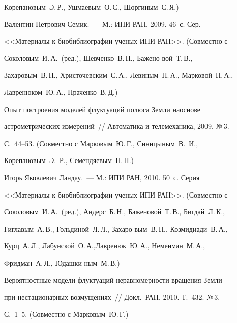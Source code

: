 Корепановым~Э.\,Р., Ушмаевым~О.\,С., Шоргиным~С.\,Я.)





 Валентин Петрович Семик.~--- М.: ИПИ РАН, 2009. 46~с. Сер.\


<<Материалы к биобиблиографии ученых ИПИ РАН>>. (Совместно с


Соколовым~И.\,А.\ (ред.), Шевченко~В.\,Н., Бажено-\linebreak вой~Т.\,В.,


Захаровым~В.\,Н., Христочевским~С.\,А., Левиным~Н.\,А., Марковой~Н.\,А.,


Лавренюком~Ю.\,А., Праченко~В.\,Д.)





 Опыт построения моделей флуктуаций полюса Земли на\linebreak осно\-ве


астрометрических измерений~// Автоматика и телемеханика, 2009. №\,3.


С.~44--53. (Совместно с Марковым~Ю.\,Г., Синицыным~В. \,И.,


Корепановым~Э. \,Р., Семендяевым~Н.\,Н.)










 Игорь Яковлевич Ландау.~--- М.: ИПИ РАН, 2010. 50~с. Серия


<<Материалы к биобиблиографии ученых ИПИ РАН>>. (Совместно с


Соколовым~И.\,А.\ (ред.), Андерс~Б.\,Н., Баженовой~Т.\,В., Бигдай~Л.\,К.,


Гиглавым~А.\,В., Гольдиной~Л.\,Л., Захаро-\linebreak вым~В.\,Н., Козмидиади~В.\,А.,


Курц~А.\,Л., Лабунской~О.\,А.,\linebreak Лавренюк~Ю.\,А., Неменман~М.\,А.,


Фридман~А.\,Л., Юдашки-\linebreak ным~М.\,В.)





 Вероятностные модели флуктуаций неравномерности вращения Земли


при нестационарных возмущениях~// Докл.\ РАН, 2010. Т.~432. №\,3.


 С.~1--5. (Совместно с Марковым~Ю.\,Г.)





